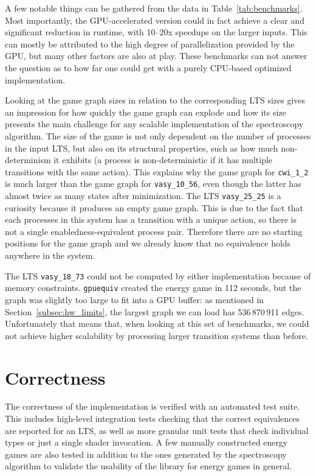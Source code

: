 A few notable things can be gathered from the data in
Table~\ref{tab:benchmarks}.
Most importantly, the GPU-accelerated version could in fact achieve
a clear and significant reduction in runtime,
with 10--20x speedups on the larger inputs.
This can mostly be attributed to the high degree of parallelization provided by
the GPU,
but many other factors are also at play.
These benchmarks can not answer the question as to how far one could get with
a purely CPU-based optimized implementation.

Looking at the game graph sizes in relation to the corresponding LTS sizes
gives an impression for how quickly the game graph can explode
and how its size presents the main challenge for any scalable implementation of
the spectroscopy algorithm.
The size of the game is not only dependent on the number of processes in the
input LTS,
but also on its structural properties,
such as how much non-determinism it exhibits
(a process is non-deterministic if it has multiple transitions with the same
action).
This explains why the game graph for \texttt{cwi\_1\_2} is much larger
than the game graph for \texttt{vasy\_10\_56},
even though the latter has almost twice as many states after minimization.
The LTS \texttt{vasy\_25\_25} is a curiosity
because it produces an empty game graph.
This is due to the fact that each processes in this system has a transition
with a unique action,
so there is not a single enabledness-equivalent process pair.
Therefore there are no starting positions for the game graph and we already
know that no equivalence holds anywhere in the system.

The LTS \texttt{vasy\_18\_73} could not be computed by either implementation
because of memory constraints.
\texttt{gpuequiv} created the energy game in 112 seconds,
but the graph was slightly too large to fit into a GPU buffer:
as mentioned in Section~\ref{subsec:hw_limits},
the largest graph we can load has 536\,870\,911 edges.
Unfortunately that means that,
when looking at this set of benchmarks,
we could not achieve higher scalability by processing larger transition systems
than before.

\section{Correctness}

The correctness of the implementation is verified with an automated test suite.
This includes high-level integration tests checking that the correct
equivalences are reported for an LTS,
as well as more granular unit tests that check individual types or just a
single shader invocation.
A few manually constructed energy games are also tested in addition to the ones
generated by the spectroscopy algorithm
to validate the usability of the library for energy games in general.

